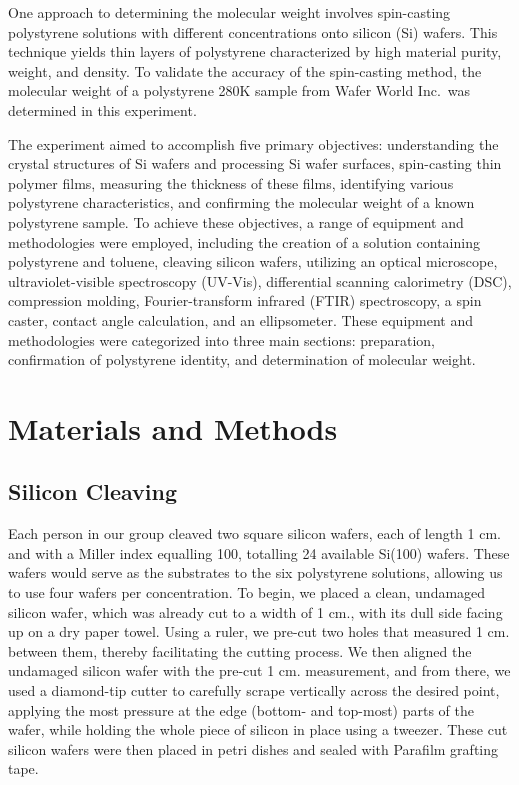 \documentclass[twocolumn]{article}
\begin{document}
        One approach to determining the molecular weight involves spin-casting polystyrene solutions with different concentrations onto silicon (Si) wafers. This technique yields thin layers of polystyrene characterized by high material purity, weight, and density\autocite{WOS:Dinelli}. To validate the accuracy of the spin-casting method, the molecular weight of a polystyrene 280K sample from Wafer World Inc.\ was determined in this experiment.
        
        The experiment aimed to accomplish five primary objectives: understanding the crystal structures of Si wafers and processing Si wafer surfaces, spin-casting thin polymer films, measuring the thickness of these films, identifying various polystyrene characteristics, and confirming the molecular weight of a known polystyrene sample. To achieve these objectives, a range of equipment and methodologies were employed, including the creation of a solution containing polystyrene and toluene, cleaving silicon wafers, utilizing an optical microscope, ultraviolet-visible spectroscopy (UV-Vis), differential scanning calorimetry (DSC), compression molding, Fourier-transform infrared (FTIR) spectroscopy, a spin caster, contact angle calculation, and an ellipsometer. These equipment and methodologies were categorized into three main sections: preparation, confirmation of polystyrene identity, and determination of molecular weight. 

        \section{Materials and Methods}
            \subsection{Silicon Cleaving}
            Each person in our group cleaved two square silicon wafers, each of length 1 cm. and with a Miller index equalling 100, totalling 24 available Si(100) wafers. These wafers would serve as the substrates to the six polystyrene solutions, allowing us to use four wafers per concentration. To begin, we placed a clean, undamaged silicon wafer, which was already cut to a width of 1 cm., with its dull side facing up on a dry paper towel. Using a ruler, we pre-cut two holes that measured 1 cm. between them, thereby facilitating the cutting process. We then aligned the undamaged silicon wafer with the pre-cut 1 cm. measurement, and from there, we used a diamond-tip cutter to carefully scrape vertically across the desired point, applying the most pressure at the edge (bottom- and top-most) parts of the wafer, while holding the whole piece of silicon in place using a tweezer. These cut silicon wafers were then placed in petri dishes and sealed with Parafilm grafting tape.
\end{document}
